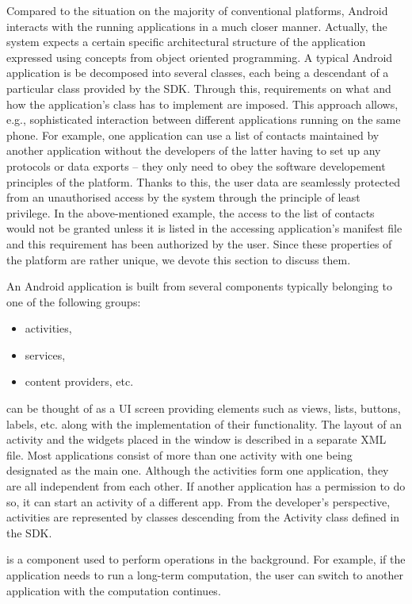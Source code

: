 Compared to the situation on the majority of conventional platforms, Android interacts with the running applications in a much closer manner. 
Actually, the system expects a certain specific architectural structure of the application expressed using concepts from object oriented programming. 
A typical Android application is be decomposed into several classes, each being a descendant of a particular class provided by the SDK. 
Through this, requirements on what and how the application's class has to implement are imposed. 
This approach allows, e.g., sophisticated interaction between different applications running on the same phone. 
For example, one application can use a list of contacts maintained by another application without the developers of the latter having to set up any protocols or data exports -- they only need to obey the software developement principles of the platform. %
Thanks to this, the user data are seamlessly protected from an unauthorised access by the system through the principle of least privilege. 
In the above-mentioned example, the access to the list of contacts would not be granted unless it is listed in the accessing application's manifest file and this requirement has been authorized by the user. 
Since these properties of the platform are rather unique, we devote this section to discuss them. 

An Android application is built from several components typically belonging to one of the following groups: 
\begin{itemize}
\item{activities,}
\item{services,}
\item{content providers, etc.}
\end{itemize}

 can be thought of as a UI screen providing elements such as views, lists, buttons, labels, etc. along with the implementation of their functionality.
The layout of an activity and the widgets placed in the window is described in a separate XML file. 
Most applications consist of more than one activity with one being designated as the main one.
Although the activities form one application, they are all independent from each other.
If another application has a permission to do so, it can start an activity of a different app.
From the developer's perspective, activities are represented by classes descending from the Activity class defined in the SDK. 

 is a component used to perform operations in the background.
For example, if the application needs to run a long-term computation, the user can switch to another application with the computation continues. 

